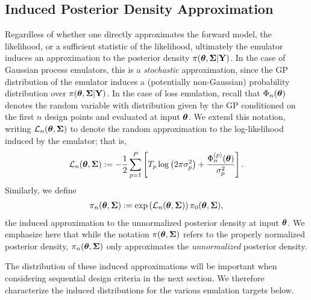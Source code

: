 \documentclass[12pt]{article}
\begin{document}
\subsection{Induced Posterior Density Approximation}
Regardless of whether one directly approximates the forward model, the likelihood, or a sufficient statistic of the likelihood, ultimately the emulator induces an approximation to the posterior 
density $\pi(\boldsymbol{\theta}, \boldsymbol{\Sigma}|\mathbf{Y})$. In the case of Gaussian process emulators, this is a \textit{stochastic} approximation, since the GP distribution of the emulator induces 
a (potentially non-Gaussian) probability distribution over $\pi(\boldsymbol{\theta}, \boldsymbol{\Sigma}|\mathbf{Y})$. In the case of loss emulation, recall that $\Phi_{n}(\boldsymbol{\theta})$ denotes the random 
variable with distribution given by the GP conditioned on the first $n$ design points and evaluated at input $\boldsymbol{\theta}$. We extend this notation, writing $\mathcal{L}_{n}(\boldsymbol{\theta}, \boldsymbol{\Sigma})$ 
to denote the random approximation to the log-likelihood induced by the emulator; that is, 
\begin{align}
\mathcal{L}_{n}(\boldsymbol{\theta}, \boldsymbol{\Sigma}) := -\frac{1}{2} \sum_{p = 1}^{P} \left[T_{p} \log\left(2\pi \sigma_{p}^2 \right) + \frac{\Phi_{n}^{(p)}(\boldsymbol{\theta})}{\sigma_{p}^2} \right].
\end{align}
Similarly, we define 
\begin{align*}
\pi_{n}(\boldsymbol{\theta}, \boldsymbol{\Sigma}) := \exp\left(\mathcal{L}_{n}(\boldsymbol{\theta}, \boldsymbol{\Sigma})\right) \pi_0(\boldsymbol{\theta}, \boldsymbol{\Sigma}),
\end{align*}
the induced approximation to the unnormalized posterior density at input $\boldsymbol{\theta}$. We emphasize here that while the notation $\pi(\boldsymbol{\theta}, \boldsymbol{\Sigma})$ refers to the 
properly normalized posterior density, $\pi_{n}(\boldsymbol{\theta}, \boldsymbol{\Sigma})$ only approximates the \textit{unnormalized} posterior density. 

The distribution of 
these induced approximations will be important when considering sequential design criteria in the next section. We therefore characterize the induced distributions for the various emulation 
targets below. 
\end{document}
